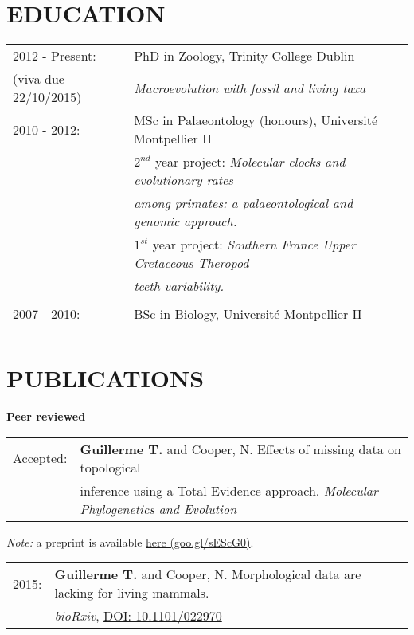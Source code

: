 \documentclass[10pt,a4paper]{article}
\begin{document}
{\section{EDUCATION}
\raggedright
\begin{tabular}{ll} 
2012 - Present: & PhD in Zoology, Trinity College Dublin\\
(viva due 22/10/2015) & \textit{Macroevolution with fossil and living taxa} \\
2010 - 2012: & MSc in Palaeontology (honours), Universit\'{e} Montpellier II\\
& $2^{nd}$ year project: \textit{Molecular clocks and evolutionary rates}\\
& \textit{among primates: a palaeontological and genomic approach.} \\
& $1^{st}$ year project: \textit{Southern France Upper Cretaceous Theropod}\\
& \textit{teeth variability.} \\
& \\
2007 - 2010: & BSc in Biology, Universit\'{e} Montpellier II\\
& \\
\end{tabular}

\section{PUBLICATIONS}
\raggedright\textbf{Peer reviewed}\\[1.5ex]
\begin{tabular}{ll}
Accepted: & \textbf{Guillerme T.} and Cooper, N. Effects of missing data on topological\\
& inference using a Total Evidence approach. \textit{Molecular Phylogenetics and Evolution}\\
\end{tabular}

\textit{Note:} a preprint is available \href{https://goo.gl/sEScG0}{here (goo.gl/sEScG0)}.
\bigskip

\begin{tabular}{ll}
2015: &\textbf{Guillerme T.} and Cooper, N. Morphological data are lacking for living mammals. \\
& \textit{bioRxiv}, \href{http://dx.doi.org/10.1101/022970}{DOI: 10.1101/022970}\\ %
\end{tabular}

}
\end{document}
